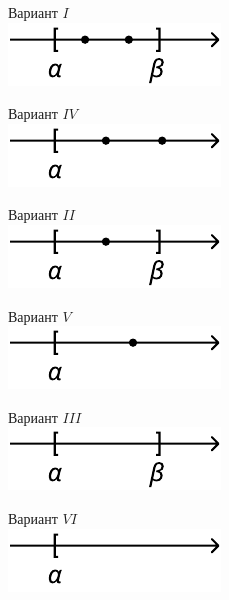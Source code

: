 \begin {figure} [h]
    \hspace{10mm}
    \begin {minipage} [t] {0.5\linewidth}
        Вариант $I$ \\ 
        \includegraphics{image/a_dd_b.pdf}
    \end {minipage}
    \hfill
    \begin {minipage} [t] {0.5\linewidth}
        Вариант $IV$ \\
        \includegraphics{image/a_dd_inf.pdf}
    \end {minipage}
    \vfill \vspace{1cm} \hspace{10mm}
    \begin {minipage} [t] {0.5\linewidth}
        Вариант $II$ \\
        \includegraphics{image/a_d_b.pdf}
    \end {minipage}
    \hfill
    \begin {minipage} [t] {0.5\linewidth}
        Вариант $V$ \\
        \includegraphics{image/a_d_inf.pdf}
    \end {minipage}
    \vfill \vspace{1cm} \hspace{10mm}
    \begin {minipage} [t] {0.5\linewidth}
        Вариант $III$ \\
        \includegraphics{image/a_b.pdf}
    \end {minipage}
    \hfill
    \begin {minipage} [t] {0.5\linewidth}
        Вариант $VI$ \\
        \includegraphics{image/a_inf.pdf}
    \end {minipage}
\end {figure}

